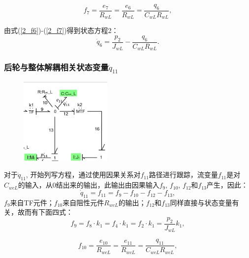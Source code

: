 \begin{equation}\label{2_f7}
f_7
=
\frac{e_{7}}{R_{w L}}
=
\frac{e_{6}}{R_{w L}}
=
\frac{q_{6}}{C_{wL} R_{w L}},
\end{equation}

由式(\ref{2_f6})-(\ref{2_f7})得到状态方程2：
\begin{equation}\label{2_q6}
\dot{q}_{6}
=
\frac{p_{2}}{J_{w L}}-\frac{q_{6}}{C_{wL} R_{w L}}.
\end{equation}

\subsubsection{后轮与整体解耦相关状态变量$\dot{q}_{11}$}
\begin{figure}[h]
	\centering
	\includegraphics[width=0.4\textwidth]{fig/2_equation3.png}
\end{figure}
对于$\dot{q} _ { 11 }$,
开始列写方程，通过使用因果关系对$f_11$路径进行跟踪，流变量$f_11$是对$C_{wcL}$的输入，从0结出来的输出，此输出由因果输入$f _ { 9 }$, $ f _ { 10 }$, $  f _ { 12 }$和$f _ { 13 }$产生，因此：
\begin{equation}\label{2_f11}
\dot{q}_{11}
=
f_{11}
=
f_9 - f_{10} - f_{12} - f_{13},
\end{equation}
$f_9$来自TF元件；$f_{10}$来自阻性元件$R _ { wcL }$的输出；$f_{12}$和$f_{13}$同样直接与状态变量有关，故而有下面四式：
\begin{equation}\label{2_f9}
f_{9}
=
f_{8} \cdot k_1
=
f_{4} \cdot k_1
=
f_{2} \cdot k_1
=
\frac{p_{2}}{J_{w L}} k_{1},
\end{equation}

\begin{equation}\label{2_f10}
f_{10}
=
\frac{e_{10}}{R_{wc L}}
=
\frac{e_{11}}{R_{wc L}}
=
\frac{q_{11}}{C_{wc L} R_{wc L}},
\end{equation}

